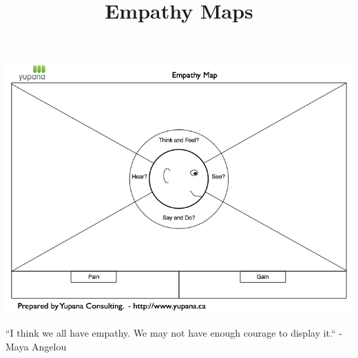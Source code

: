 \documentclass{ximera}
\title{Empathy Maps}
\begin{document}
\begin{abstract}

\end{abstract}
\maketitle

\begin{image}
\includegraphics{Empathy-Map.png}
\end{image}

``I think we all have empathy. We may not have enough courage to display it.`` - Maya Angelou
\end{document}
